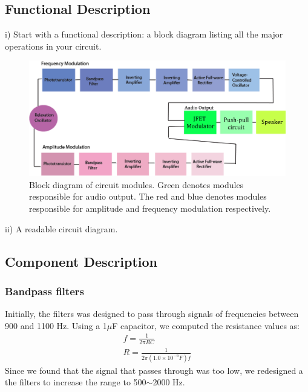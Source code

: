 \documentclass[twocolumn]{article}
\begin{document}
\subsection{Functional Description}
i)                Start with a functional description: a block diagram listing all the major operations in your circuit.
\begin{figure}[h!]
 \centering
\includegraphics[width=\textwidth]{figure/block}
\caption{Block diagram of circuit modules. Green denotes modules responsible for audio output. The red and blue denotes modules responsible for amplitude and frequency modulation respectively.}
\label{block}
\end{figure}
ii)              A readable circuit diagram.
\subsection{Component Description}
\subsubsection{Bandpass filters}
Initially, the filters was designed to pass through signals of frequencies between 900 and 1100 Hz. Using a 1$\mu$F capacitor, we computed the resistance values as: 
\begin{align*}
f = \frac{1}{2\pi RC}
\\ R = \frac{1}{2\pi (1.0\times10^{-6} F)f}
\end{align*}
Since we found that the signal that passes through was too low, we redesigned a the filters to increase the range to 500$\sim$2000 Hz.
\end{document}
